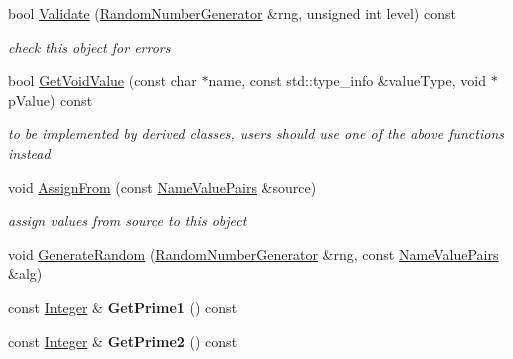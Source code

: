 \begin{DoxyCompactItemize}
\item 
bool \hyperlink{class_invertible_e_s_i_g_n_function_a7ff23978311f9f86024f8287d3fd02a8}{Validate} (\hyperlink{class_random_number_generator}{RandomNumberGenerator} \&rng, unsigned int level) const 
\begin{DoxyCompactList}\small\item\em check this object for errors \item\end{DoxyCompactList}\item 
\hypertarget{class_invertible_e_s_i_g_n_function_a6532958ce2c456eef8b84c33f69e944d}{
bool \hyperlink{class_invertible_e_s_i_g_n_function_a6532958ce2c456eef8b84c33f69e944d}{GetVoidValue} (const char $\ast$name, const std::type\_\-info \&valueType, void $\ast$pValue) const }
\label{class_invertible_e_s_i_g_n_function_a6532958ce2c456eef8b84c33f69e944d}

\begin{DoxyCompactList}\small\item\em to be implemented by derived classes, users should use one of the above functions instead \item\end{DoxyCompactList}\item 
void \hyperlink{class_invertible_e_s_i_g_n_function_aca870e350b30d04a47d452f21e903278}{AssignFrom} (const \hyperlink{class_name_value_pairs}{NameValuePairs} \&source)
\begin{DoxyCompactList}\small\item\em assign values from source to this object \item\end{DoxyCompactList}\item 
void \hyperlink{class_invertible_e_s_i_g_n_function_a241b733193f9f420f188ca6f57d49c27}{GenerateRandom} (\hyperlink{class_random_number_generator}{RandomNumberGenerator} \&rng, const \hyperlink{class_name_value_pairs}{NameValuePairs} \&alg)
\item 
\hypertarget{class_invertible_e_s_i_g_n_function_a32781785640ec331c3837ffce43c2026}{
const \hyperlink{class_integer}{Integer} \& {\bfseries GetPrime1} () const }
\label{class_invertible_e_s_i_g_n_function_a32781785640ec331c3837ffce43c2026}

\item 
\hypertarget{class_invertible_e_s_i_g_n_function_a379f19970546a3fe0038a05ea5434db3}{
const \hyperlink{class_integer}{Integer} \& {\bfseries GetPrime2} () const }
\label{class_invertible_e_s_i_g_n_function_a379f19970546a3fe0038a05ea5434db3}


\end{DoxyCompactItemize}
